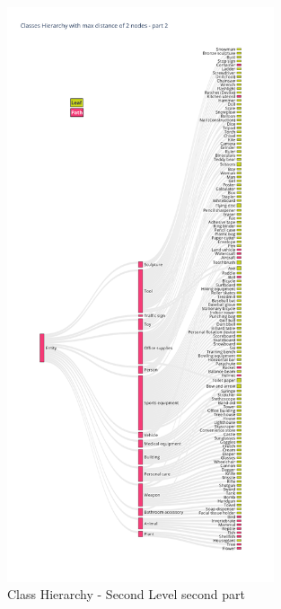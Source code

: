 \documentclass[11pt, a4paper, twocolumn]{article}
\begin{document}
\begin{appendices}
\begin{figure}[!ht]
		\includegraphics[width=0.7\textwidth]{lvl2_classes_pt2.png}
		\caption{\scriptsize Class Hierarchy - Second Level second part}
	\end{figure}
	

\end{appendices}
\end{document}
